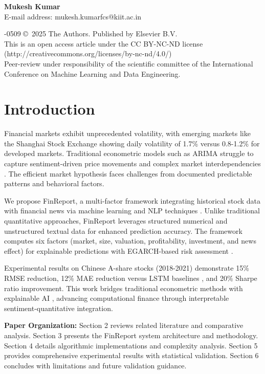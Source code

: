\documentclass[3p,times,procedia]{elsarticle}
\begin{document}
\vspace{12pt}
\noindent\textbf{Mukesh Kumar}\\
E-mail address: mukesh.kumarfcs@kiit.ac.in

\vspace{6pt}
-0509 \copyright\ 2025 The Authors. Published by Elsevier B.V.\\
This is an open access article under the CC BY-NC-ND license (http://creativecommons.org/licenses/by-nc-nd/4.0/)\\
Peer-review under responsibility of the scientific committee of the International Conference on Machine Learning and Data Engineering.

\vspace{12pt}

\section{Introduction}
\label{main}

Financial markets exhibit unprecedented volatility, with emerging markets like the Shanghai Stock Exchange showing daily volatility of 1.7\% versus 0.8-1.2\% for developed markets. Traditional econometric models such as ARIMA \cite{Box1970} struggle to capture sentiment-driven price movements and complex market interdependencies \cite{FAMA1993}. The efficient market hypothesis faces challenges from documented predictable patterns and behavioral factors.

We propose FinReport, a multi-factor framework integrating historical stock data with financial news via machine learning and NLP techniques \cite{Bao2017}. Unlike traditional quantitative approaches, FinReport leverages structured numerical and unstructured textual data for enhanced prediction accuracy. The framework computes six factors (market, size, valuation, profitability, investment, and news effect) for explainable predictions with EGARCH-based risk assessment \cite{Nelson1991}.

Experimental results on Chinese A-share stocks (2018-2021) \cite{FinReportDataset2025} demonstrate 15\% RMSE reduction, 12\% MAE reduction versus LSTM baselines \cite{Fischer2018}, and 20\% Sharpe ratio improvement. This work bridges traditional econometric methods with explainable AI \cite{TETLOCK2007,Ribeiro2016}, advancing computational finance through interpretable sentiment-quantitative integration.

\textbf{Paper Organization:} Section 2 reviews related literature and comparative analysis. Section 3 presents the FinReport system architecture and methodology. Section 4 details algorithmic implementations and complexity analysis. Section 5 provides comprehensive experimental results with statistical validation. Section 6 concludes with limitations and future validation guidance.
\end{document}
